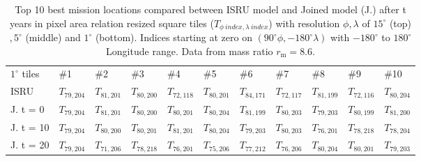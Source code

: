 \documentclass[utf8]{FrontiersinHarvard} %
\begin{document}
\begin{table}[h!]
\begin{tabular}{lllllllllll}
$1^{\circ}$ tiles  & \#1                                  & \#2                                  & \#3                                  & \#4                                  & \#5                                  & \#6                                  & \#7                                  & \#8                                  & \#9                                  & \#10                                 \\
ISRU               & \cellcolor[HTML]{00FF00}$T_{79,204}$ & \cellcolor[HTML]{88FF00}$T_{81,201}$ & \cellcolor[HTML]{B8FF00}$T_{80,200}$ & \cellcolor[HTML]{E8FF00}$T_{72,118}$ & \cellcolor[HTML]{FFFF00}$T_{80,201}$ & \cellcolor[HTML]{FFEE00}$T_{84,171}$ & \cellcolor[HTML]{FFDD00}$T_{72,117}$ & \cellcolor[HTML]{FFCC00}$T_{81,199}$ & \cellcolor[HTML]{FFBB00}$T_{72,116}$ & \cellcolor[HTML]{FFAA00}$T_{80,204}$ \\
J. t = 0           & \cellcolor[HTML]{00FF00}$T_{79,204}$ & \cellcolor[HTML]{88FF00}$T_{81,201}$ & \cellcolor[HTML]{B8FF00}$T_{80,200}$ & \cellcolor[HTML]{FFFF00}$T_{80,201}$ & \cellcolor[HTML]{FFAA00}$T_{80,204}$ & \cellcolor[HTML]{FFCC00}$T_{81,199}$ & $T_{80,203}$                         & $T_{79,203}$                         & $T_{80,199}$                         & $T_{81,200}$                         \\
J. t = 10          & \cellcolor[HTML]{00FF00}$T_{79,204}$ & \cellcolor[HTML]{B8FF00}$T_{80,200}$ & \cellcolor[HTML]{FFFF00}$T_{80,201}$ & $T_{81,201}$                         & \cellcolor[HTML]{FFAA00}$T_{80,204}$ & $T_{79,203}$                         & $T_{80,203}$                         & $T_{76,201}$                         & $T_{78,218}$                         & $T_{78,204}$                         \\
J. t = 20          & \cellcolor[HTML]{00FF00}$T_{79,204}$ & $T_{71,206}$                         & $T_{78,218}$                         & $T_{76,201}$                         & $T_{75,206}$                         & $T_{77,212}$                         & $T_{76,206}$                         & \cellcolor[HTML]{FFAA00}$T_{80,204}$ & \cellcolor[HTML]{FFFF00}$T_{80,201}$ & $T_{79,203}$                        
\end{tabular}
\caption{Top 10 best mission locations compared between ISRU model and Joined model (J.) after t years in pixel area relation resized square tiles ($T_{\phi \ index, \lambda \ index}$) with resolution $\phi , \lambda$ of $15^{\circ}$ (top) $,5^{\circ}$ (middle) and $1^{\circ}$ (bottom). Indices starting at zero on $(90^{\circ} \phi, -180^{\circ} \lambda)$ with $-180^{\circ}$ to $180^{\circ}$ Longitude range. Data from mass ratio $r_{\mathrm{m}}=8.6$.}
\label{tab:location-selection-result}
\end{table}
\end{document}
